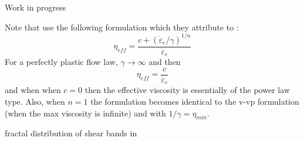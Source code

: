 {Work in progress}

\Literature \cite{zico74,zigo74,zico74b,zien75,corm75,zigo75,zihl75,zijo78,vidm82,vidm84,vede84,zivt85,vimd86}
\cite{wasd97,debo88,debo01,hesd02,bewv11,mumg10,leor89,sccm13,desm93,demu92,debo91,shmv16}\cite{dusp15}
\cite{modm01}\cite{baji02}\cite{slde92}\cite{lepo13}\cite{dias04}\cite{dura01}\cite{dusd18}
\cite{modm02}\cite{vavd99}\cite{miam13}\cite{huly99}\cite{hugh83}\cite{frhb16}

Note that \cite{vidm82,vidm84,vimd86,zivt85} use the following formulation which they attribute to \cite{zijo78}:
\[
\eta_{eff} = \frac{c + (\dot{\varepsilon}_e / \gamma)^{1/n}}{ \dot{\varepsilon}_e }
\] 
For a perfectly plastic flow law, $\gamma \rightarrow \infty$ and then 
\[
\eta_{eff} = \frac{c}{ \dot{\varepsilon}_e }
\] 
and when when $c=0$ then the effective viscosity is essentially of the power law type.
Also, when $n=1$ the formulation becomes identical to the v-vp formulation (when the max viscosity is infinite) and with $1/\gamma=\eta_{min}$.

fractal distribution of shear bands in \cite{pohp94}



